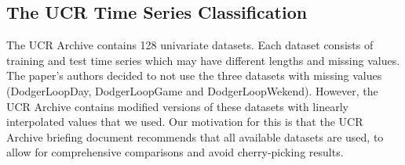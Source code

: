 \documentclass{article}
\begin{document}


\newpage
\subsection{The UCR Time Series Classification}
\label{ucr}

The UCR Archive contains 128 univariate datasets. Each dataset consists of training and test time series which may have different lengths and missing values. The paper's authors decided to not use the three datasets with missing values (DodgerLoopDay, DodgerLoopGame and DodgerLoopWekend). However, the UCR Archive contains modified versions of these datasets with linearly interpolated values that we used. Our motivation for this is that the UCR Archive briefing document recommends that all available datasets are used, to allow for comprehensive comparisons and avoid cherry-picking results.
\end{document}
